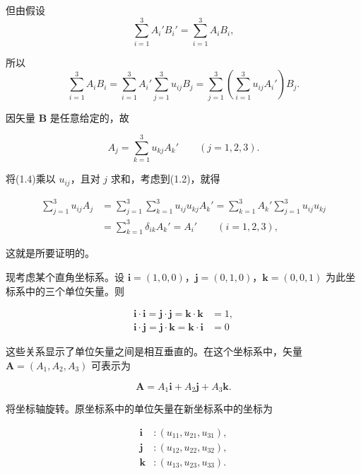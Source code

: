 \documentclass[11pt,a4paper,oneside]{ctexbook}
\newcommand{\ve}[1]{\bm{#1}}
\begin{document}
但由假设
\begin{equation*}
\sum_{i=1}^{3} A_i' B_i' = \sum_{i=1}^{3} A_i B_i,
\end{equation*}

所以
\begin{equation*}
\sum_{i=1}^{3} A_i B_i = \sum_{i=1}^{3} A_i' \sum_{j=1}^{3} u_{ij} B_j = \sum_{j=1}^{3} \left(\sum_{i=1}^{3} u_{ij} A_i'\right) B_j.
\end{equation*}

因矢量 $\ve{B}$ 是任意给定的，故

\begin{equation}
A_j = \sum_{k=1}^{3} u_{kj} A_k' \qquad (j = 1, 2, 3).
\tag{1.4}
\end{equation}

将(1.4)乘以 $u_{ij}$，且对 $j$ 求和，考虑到(1.2)，就得

\begin{equation*}
\begin{aligned}
\sum_{j=1}^{3} u_{ij} A_j
&= \sum_{j=1}^{3} \sum_{k=1}^{3} u_{ij} u_{kj} A_k' = \sum_{k=1}^{3} A_k' \sum_{j=1}^{3} u_{ij} u_{kj}\\
&= \sum_{k=1}^{3} \delta_{ik} A_k' = A_i' \qquad (i = 1, 2, 3),
\end{aligned}
\end{equation*}

这就是所要证明的。

现考虑某个直角坐标系。设 $\ve{i} = (1, 0, 0)$，$\ve{j} = (0, 1, 0)$，$\ve{k} = (0, 0, 1)$ 为此坐标系中的三个单位矢量。则

\begin{equation*}
\begin{aligned}
\ve{i} \cdot \ve{i} = \ve{j} \cdot \ve{j} = \ve{k} \cdot \ve{k} &= 1,\\
\ve{i} \cdot \ve{j} = \ve{j} \cdot \ve{k} = \ve{k} \cdot \ve{i} &= 0
\end{aligned}
\end{equation*}

这些关系显示了单位矢量之间是相互垂直的。在这个坐标系中，矢量 $\ve{A} = (A_1, A_2, A_3)$ 可表示为

\begin{equation}
\ve{A} = A_1 \ve{i} + A_2 \ve{j} + A_3 \ve{k}.
\tag{1.5}
\end{equation}

将坐标轴旋转。原坐标系中的单位矢量在新坐标系中的坐标为

\begin{equation*}
\begin{aligned}
\ve{i} &: (u_{11}, u_{21}, u_{31}),\\
\ve{j} &: (u_{12}, u_{22}, u_{32}),\\
\ve{k} &: (u_{13}, u_{23}, u_{33}).
\end{aligned}
\end{equation*}
\end{document}
